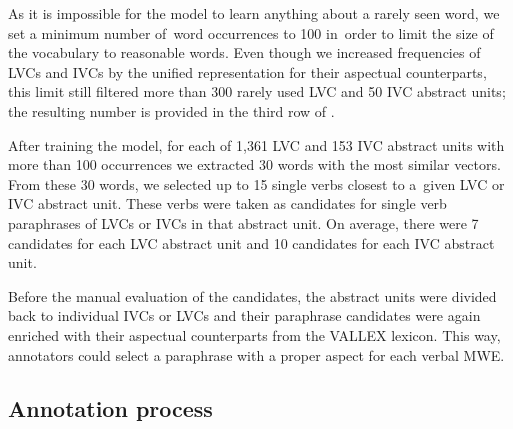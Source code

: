 \documentclass[output=paper
,modfonts
,nonflat]{langsci/langscibook}
\begin{document}
As it is impossible for the model to learn anything about a rarely seen word, we set a minimum number of~word occurrences to 100 in~order to limit the size 
of the vocabulary to reasonable words. Even though we increased frequencies 
of LVCs and IVCs by the unified representation for their aspectual counterparts, 
this limit still filtered more than 300 rarely used LVC and 50 IVC abstract units; 
the resulting number is provided in the third row of .

After training the model, for each of 1,361 LVC and 153 IVC abstract units with 
more than 100 occurrences we extracted 30 words with the most similar vectors. 
From these 30 words, we selected up to 15 single verbs closest to a~given 
LVC or IVC abstract unit. These verbs were taken as candidates for single verb 
paraphrases of LVCs or IVCs in that abstract unit. On average, there were 7 
candidates for each LVC abstract unit and 10 candidates for each IVC abstract 
unit.

Before the manual evaluation of the candidates, the abstract units were divided 
back to individual IVCs or LVCs and their paraphrase candidates were again 
enriched with their aspectual counterparts from the VALLEX lexicon. This way, annotators 
could select a paraphrase with a proper aspect for each verbal MWE.

%


\subsection{Annotation process}
\label{baran:sec:annotation}
\end{document}
